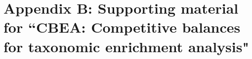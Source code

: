 \chapter{Appendix B: Supporting material for ``CBEA: Competitive balances for taxonomic enrichment analysis"}